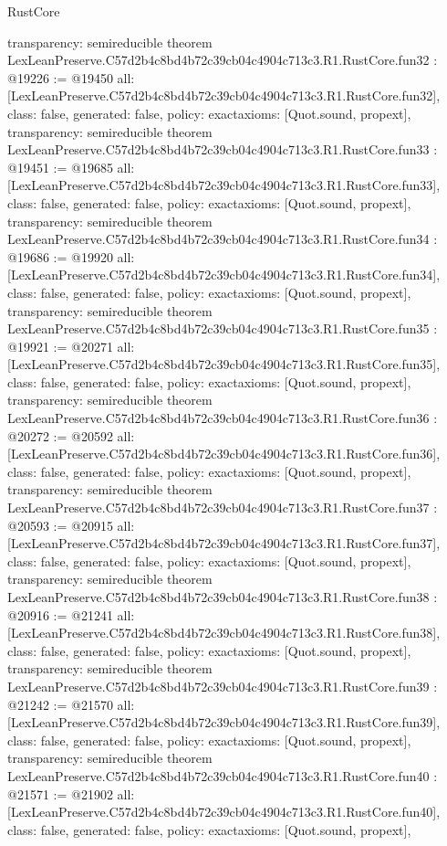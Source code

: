 \begin{lexlean}{RustCore}
\begin{coremodule}
{  transparency: semireducible
}
theorem LexLeanPreserve.C57d2b4c8bd4b72c39cb04c4904c713c3.R1.RustCore.fun32 : @19226 := @19450 {
  all: [LexLeanPreserve.C57d2b4c8bd4b72c39cb04c4904c713c3.R1.RustCore.fun32],
  class: false,
  generated: false,
  policy: exact{axioms: [Quot.sound, propext]},
  transparency: semireducible
}
theorem LexLeanPreserve.C57d2b4c8bd4b72c39cb04c4904c713c3.R1.RustCore.fun33 : @19451 := @19685 {
  all: [LexLeanPreserve.C57d2b4c8bd4b72c39cb04c4904c713c3.R1.RustCore.fun33],
  class: false,
  generated: false,
  policy: exact{axioms: [Quot.sound, propext]},
  transparency: semireducible
}
theorem LexLeanPreserve.C57d2b4c8bd4b72c39cb04c4904c713c3.R1.RustCore.fun34 : @19686 := @19920 {
  all: [LexLeanPreserve.C57d2b4c8bd4b72c39cb04c4904c713c3.R1.RustCore.fun34],
  class: false,
  generated: false,
  policy: exact{axioms: [Quot.sound, propext]},
  transparency: semireducible
}
theorem LexLeanPreserve.C57d2b4c8bd4b72c39cb04c4904c713c3.R1.RustCore.fun35 : @19921 := @20271 {
  all: [LexLeanPreserve.C57d2b4c8bd4b72c39cb04c4904c713c3.R1.RustCore.fun35],
  class: false,
  generated: false,
  policy: exact{axioms: [Quot.sound, propext]},
  transparency: semireducible
}
theorem LexLeanPreserve.C57d2b4c8bd4b72c39cb04c4904c713c3.R1.RustCore.fun36 : @20272 := @20592 {
  all: [LexLeanPreserve.C57d2b4c8bd4b72c39cb04c4904c713c3.R1.RustCore.fun36],
  class: false,
  generated: false,
  policy: exact{axioms: [Quot.sound, propext]},
  transparency: semireducible
}
theorem LexLeanPreserve.C57d2b4c8bd4b72c39cb04c4904c713c3.R1.RustCore.fun37 : @20593 := @20915 {
  all: [LexLeanPreserve.C57d2b4c8bd4b72c39cb04c4904c713c3.R1.RustCore.fun37],
  class: false,
  generated: false,
  policy: exact{axioms: [Quot.sound, propext]},
  transparency: semireducible
}
theorem LexLeanPreserve.C57d2b4c8bd4b72c39cb04c4904c713c3.R1.RustCore.fun38 : @20916 := @21241 {
  all: [LexLeanPreserve.C57d2b4c8bd4b72c39cb04c4904c713c3.R1.RustCore.fun38],
  class: false,
  generated: false,
  policy: exact{axioms: [Quot.sound, propext]},
  transparency: semireducible
}
theorem LexLeanPreserve.C57d2b4c8bd4b72c39cb04c4904c713c3.R1.RustCore.fun39 : @21242 := @21570 {
  all: [LexLeanPreserve.C57d2b4c8bd4b72c39cb04c4904c713c3.R1.RustCore.fun39],
  class: false,
  generated: false,
  policy: exact{axioms: [Quot.sound, propext]},
  transparency: semireducible
}
theorem LexLeanPreserve.C57d2b4c8bd4b72c39cb04c4904c713c3.R1.RustCore.fun40 : @21571 := @21902 {
  all: [LexLeanPreserve.C57d2b4c8bd4b72c39cb04c4904c713c3.R1.RustCore.fun40],
  class: false,
  generated: false,
  policy: exact{axioms: [Quot.sound, propext]},
}
\end{coremodule}
\end{lexlean}
